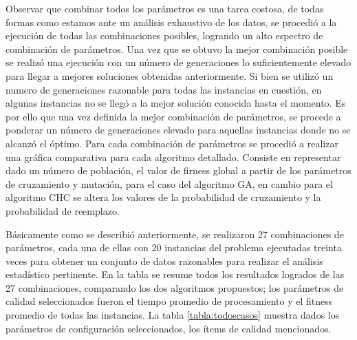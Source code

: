 \documentclass[journal]{IEEEtran}
\begin{document}
Observar que combinar todos los parámetros es una tarea costosa, de todas formas como estamos ante un análisis exhaustivo de los datos, se procedió a la ejecución de todas las combinaciones posibles, logrando un alto espectro de combinación de parámetros. Una vez que se obtuvo la mejor combinación posible se realizó una ejecución con un número de generaciones lo suficientemente elevado para llegar a mejores soluciones obtenidas anteriormente. Si bien se utilizó un numero de generaciones razonable para todas las instancias en cuestión, en algunas instancias no se llegó a la mejor solución conocida hasta el momento.  Es por ello que una vez definida la mejor combinación de parámetros, se procede a ponderar un número de generaciones elevado para aquellas instancias donde no se alcanzó el óptimo. Para cada combinación de parámetros se procedió a realizar una gráfica comparativa para cada algoritmo detallado. Consiste en representar dado un número de población, el valor de firness global a partir de los parámetros de cruzamiento y mutación, para el caso del algoritmo GA, en cambio para el algoritmo CHC se altera los valores de la probabilidad de cruzamiento  y la probabilidad de reemplazo.

Básicamente como se describió anteriormente, se realizaron 27 combinaciones de parámetros, cada una de ellas con 20 instancias del problema ejecutadas treinta veces para obtener un conjunto de datos razonables para realizar el análisis estadístico pertinente. En la tabla se resume todos los resultados logrados de las 27 combinaciones, comparando los dos algoritmos propuestos; los parámetros de calidad seleccionados fueron el tiempo promedio de procesamiento y el fitness promedio de todas las instancias. La tabla \ref{tabla:todoscasos} muestra dados los parámetros de configuración seleccionados, los ítems de calidad mencionados.
 
 
\end{document}
